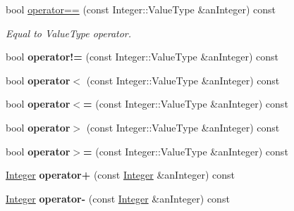 \begin{DoxyCompactItemize}
bool \hyperlink{classlibrary_1_1core_1_1types_1_1_integer_a02858e726140a9e84281699a41675081}{operator==} (const Integer\+::\+Value\+Type \&an\+Integer) const
\begin{DoxyCompactList}\small\item\em Equal to Value\+Type operator. \end{DoxyCompactList}\item 
\mbox{\label{classlibrary_1_1core_1_1types_1_1_integer_a9c3c4e9564a3a8da5133207f3197d3a3}} 
bool {\bfseries operator!=} (const Integer\+::\+Value\+Type \&an\+Integer) const
\item 
\mbox{\label{classlibrary_1_1core_1_1types_1_1_integer_ad893d193755f414dd680fd867ff30ea0}} 
bool {\bfseries operator$<$} (const Integer\+::\+Value\+Type \&an\+Integer) const
\item 
\mbox{\label{classlibrary_1_1core_1_1types_1_1_integer_a09f6844cd7557f087116a50869765eaa}} 
bool {\bfseries operator$<$=} (const Integer\+::\+Value\+Type \&an\+Integer) const
\item 
\mbox{\label{classlibrary_1_1core_1_1types_1_1_integer_a1e0736e7d215b2ad2e7291a983490bf5}} 
bool {\bfseries operator$>$} (const Integer\+::\+Value\+Type \&an\+Integer) const
\item 
\mbox{\label{classlibrary_1_1core_1_1types_1_1_integer_a88077b530da644e33e6346837035eb9d}} 
bool {\bfseries operator$>$=} (const Integer\+::\+Value\+Type \&an\+Integer) const
\item 
\mbox{\label{classlibrary_1_1core_1_1types_1_1_integer_ade47c7abcdbcdc8c4a369a46b7d0dcef}} 
\hyperlink{classlibrary_1_1core_1_1types_1_1_integer}{Integer} {\bfseries operator+} (const \hyperlink{classlibrary_1_1core_1_1types_1_1_integer}{Integer} \&an\+Integer) const
\item 
\mbox{\label{classlibrary_1_1core_1_1types_1_1_integer_a728dd9f86ee7d512787f2024a7194913}} 
\hyperlink{classlibrary_1_1core_1_1types_1_1_integer}{Integer} {\bfseries operator-\/} (const \hyperlink{classlibrary_1_1core_1_1types_1_1_integer}{Integer} \&an\+Integer) const

\end{DoxyCompactItemize}
